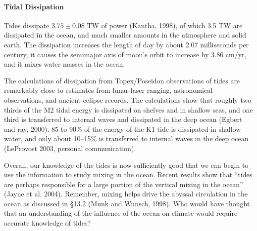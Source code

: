 \paragraph{Tidal Dissipation}
Tides dissipate $3.75\pm0.08$ TW of power
(Kantha, 1998), of which 3.5 TW are dissipated in the ocean, and much
smaller amounts in the atmosphere and solid earth. The dissipation
increases the length of day by about 2.07 milliseconds per century, it
causes the semimajor axis of moon's orbit to increase by 3.86 cm/yr,
and it mixes water masses in the ocean.

The calculations of dissipation from
Topex/Poseidon
observations of tides are remarkably close to estimates from
lunar-laser ranging, astronomical observations, and ancient eclipse
records. The calculations show that roughly two thirds of the M2 tidal
energy is dissipated on shelves and in shallow seas, and one third is
transferred to internal waves and dissipated in the deep ocean (Egbert
and ray, 2000). 85 to 90\% of the energy of the K1 tide is dissipated
in shallow water, and only about 10--15\% is transferred to internal
waves in the deep ocean (LeProvost 2003, personal communication).

Overall, our knowledge of the tides is now sufficiently good that we
can begin to use the information to study mixing
in the ocean. Recent results show that ``tides are perhaps responsible
for a large portion of the vertical mixing in the ocean'' (Jayne et
al. 2004). Remember, mixing helps drive the abyssal
circulation in the ocean as discussed in \S 13.2 (Munk and
Wunsch, 1998). Who would have thought that an understanding of the
influence of the ocean on climate would require accurate knowledge of
tides?

